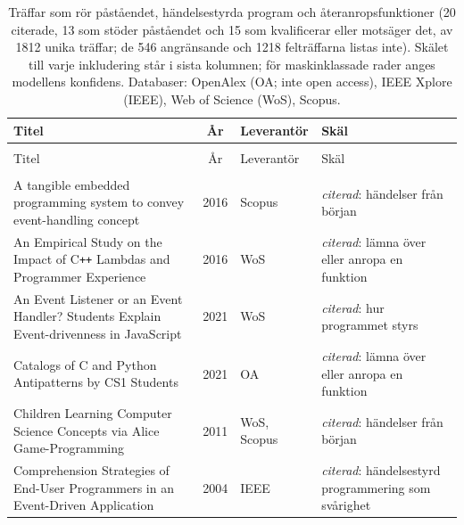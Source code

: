 
\begingroup\footnotesize
\begin{longtable}{@{}%
  >{\raggedright\arraybackslash}p{}c%
  >{\raggedright\arraybackslash}p{}%
  >{\raggedright\arraybackslash}p{}@{}}
\caption{Träffar som rör påståendet, händelsestyrda program och återanropsfunktioner (20 citerade, 13 som stöder påståendet och 15 som kvalificerar eller motsäger det, av 1812 unika träffar; de 546 angränsande och 1218 felträffarna listas inte). Skälet till varje inkludering står i sista kolumnen; för maskinklassade rader anges modellens konfidens. Databaser: OpenAlex (OA; inte \foreignlanguage{english}{open access}), IEEE Xplore (IEEE), Web of Science (WoS), Scopus.}\label{tab:sok-grafik-handelser}\\
\toprule
Titel & År & Leverantör & Skäl \\
\midrule
\endfirsthead
\multicolumn{4}{@{}l}{\emph{\tablename~\thetable{} (forts.)}}\\
\toprule
Titel & År & Leverantör & Skäl \\
\midrule
\endhead
\midrule \multicolumn{4}{r@{}}{\emph{forts.\ på nästa sida}}\\
\endfoot
\bottomrule
\endlastfoot
A tangible embedded programming system to convey event-handling concept & 2016 & Scopus & \emph{citerad}: händelser från början \\
An Empirical Study on the Impact of C\texttt{++} Lambdas and Programmer Experience & 2016 & WoS & \emph{citerad}: lämna över eller anropa en funktion \\
An Event Listener or an Event Handler? Students Explain Event-drivenness in JavaScript & 2021 & WoS & \emph{citerad}: hur programmet styrs \\
Catalogs of C and Python Antipatterns by CS1 Students & 2021 & OA & \emph{citerad}: lämna över eller anropa en funktion \\
Children Learning Computer Science Concepts via Alice Game-Programming & 2011 & WoS, Scopus & \emph{citerad}: händelser från början \\
Comprehension Strategies of End-User Programmers in an Event-Driven Application & 2004 & IEEE & \emph{citerad}: händelsestyrd programmering som svårighet \\

\end{longtable}
